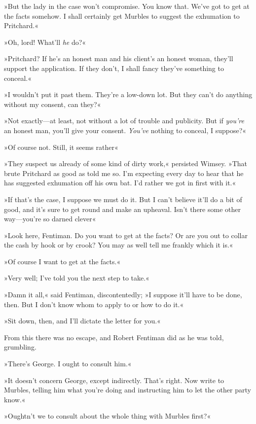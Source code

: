 »But the lady in the case won't compromise. You know that. We've got to get at the facts somehow. I shall certainly get Murbles to suggest the exhumation to Pritchard.«

»Oh, lord! What'll \textit{he} do?«

»Pritchard? If he's an honest man and his client's an honest woman, they'll support the application. If they don't, I shall fancy they've something to conceal.«

»I wouldn't put it past them. They're a low-down lot. But they can't do anything without my consent, can they?«

»Not exactly\allowbreak---\allowbreak at least, not without a lot of trouble and publicity. But if \textit{you're} an honest man, you'll give your consent. \textit{You've} nothing to conceal, I suppose?«

»Of course not. Still, it seems rather\longdash«

»They suspect us already of some kind of dirty work,« persisted Wimsey. »That brute Pritchard as good as told me so. I'm expecting every day to hear that he has suggested exhumation off his own bat. I'd rather we got in first with it.«

»If that's the case, I suppose we must do it. But I can't believe it'll do a bit of good, and it's sure to get round and make an upheaval. Isn't there some other way\allowbreak---\allowbreak you're so darned clever\longdash«

»Look here, Fentiman. Do you want to get at the facts? Or are you out to collar the cash by hook or by crook? You may as well tell me frankly which it is.«

»Of course I want to get at the facts.«

»Very well; I've told you the next step to take.«

»Damn it all,« said Fentiman, discontentedly; »I suppose it'll have to be done, then. But I don't know whom to apply to or how to do it.«

»Sit down, then, and I'll dictate the letter for you.«

From this there was no escape, and Robert Fentiman did as he was told, grumbling.

»There's George. I ought to consult him.«

»It doesn't concern George, except indirectly. That's right. Now write to Murbles, telling him what you're doing and instructing him to let the other party know.«

»Oughtn't we to consult about the whole thing with Murbles first?«

